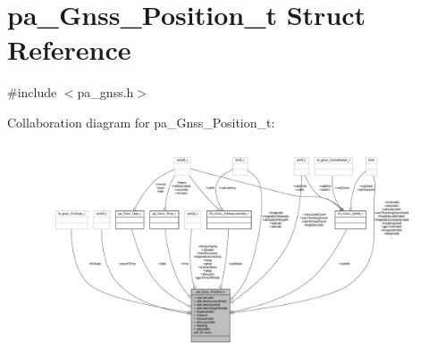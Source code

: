 \hypertarget{structpa___gnss___position__t}{}\section{pa\+\_\+\+Gnss\+\_\+\+Position\+\_\+t Struct Reference}
\label{structpa___gnss___position__t}


{\ttfamily \#include $<$pa\+\_\+gnss.\+h$>$}



Collaboration diagram for pa\+\_\+\+Gnss\+\_\+\+Position\+\_\+t\+:
\nopagebreak
\begin{figure}[H]
\begin{center}
\leavevmode
\includegraphics[width=350pt]{structpa___gnss___position__t__coll__graph}
\end{center}
\end{figure}

